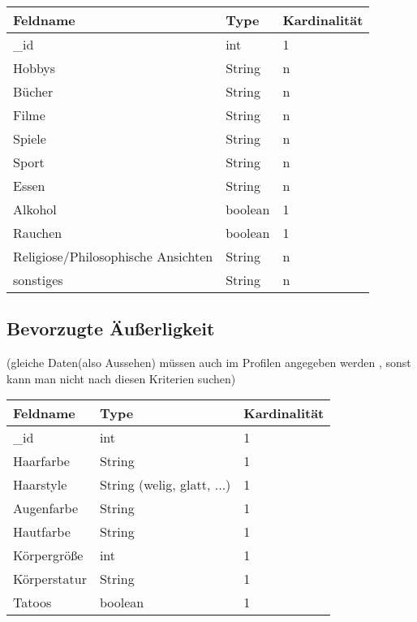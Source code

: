 \documentclass{article}
\begin{document}
\begin{center}
\tablefirsthead{}
\tablehead{}
\tabletail{}
\tablelasttail{}
\begin{supertabular}{|m{5.467cm}|m{5.467cm}|m{5.467cm}|}
\hline
Feldname &
Type &
Kardinalität\\\hline
\_id &
int &
1\\\hline
Hobbys &
String &
n\\\hline
Bücher &
String &
n\\\hline
Filme &
String &
n\\\hline
Spiele &
String &
n\\\hline
Sport &
String &
n\\\hline
Essen &
String &
n\\\hline
Alkohol &
boolean &
1\\\hline
Rauchen &
boolean &
1\\\hline
Religiose/Philosophische Ansichten  &
String &
n\\\hline
sonstiges &
String &
n\\\hline
\end{supertabular}
\end{center}

\newpage
\subsection[Bevorzugte Äußerligkeit]{Bevorzugte Äußerligkeit}
\textcolor{zubesprechen}{(gleiche Daten(also Aussehen) müssen auch im Profilen
angegeben werden , sonst kann man nicht nach diesen Kriterien suchen)}

\begin{center}
\tablefirsthead{}
\tablehead{}
\tabletail{}
\tablelasttail{}
\begin{supertabular}{|m{5.467cm}|m{5.467cm}|m{5.467cm}|}
\hline
Feldname &
Type &
Kardinalität\\\hline
\_id &
int &
1\\\hline
Haarfarbe &
String &
1\\\hline
Haarstyle &
String (welig, glatt, ...) &
1\\\hline
Augenfarbe &
String &
1\\\hline
Hautfarbe &
String &
1\\\hline
Körpergrö{\ss}e &
int &
1\\\hline
Körperstatur &
String &
1\\\hline
Tatoos &
boolean &
1\\\hline
\end{supertabular}
\end{center}
\end{document}
